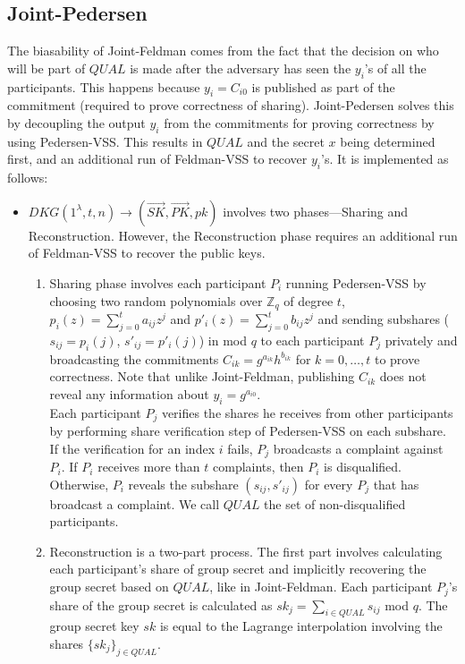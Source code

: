 \documentclass[letterpaper,twocolumn,10pt]{article}
\theoremstyle{definition}
\theoremstyle{remark}
\begin{document}
\subsection{Joint-Pedersen}
\label{appendix:jointPedersen}
The biasability of Joint-Feldman comes from the fact that the decision on who will be part of $QUAL$ is made after the adversary has seen the $y_i$'s of all the participants. This happens because $y_i = C_{i0}$ is published as part of the commitment (required to prove correctness of sharing). Joint-Pedersen solves this by decoupling the output $y_i$ from the commitments for proving correctness by using Pedersen-VSS. This results in $QUAL$ and the secret $x$ being determined first, and an additional run of Feldman-VSS to recover $y_i$'s. It is implemented as follows:
\begin{itemize}
    \item $DKG(1^{\lambda}, t, n) \rightarrow (\vec{SK}, \vec{PK}, pk)$ involves two phases---Sharing and Reconstruction. However, the Reconstruction phase requires an additional run of Feldman-VSS to recover the public keys. 
    \begin{enumerate}
    \item Sharing phase involves each participant $P_i$ running Pedersen-VSS by choosing two random polynomials over $\mathbb{Z}_q$ of degree $t$, $p_i(z) = \sum_{j = 0}^{t} a_{ij} z^j$ and $p'_i(z) = \sum_{j = 0}^{t} b_{ij} z^j$ and sending subshares ($s_{ij} = p_i(j)$, $s'_{ij} = p'_i(j)$) in mod $q$ to each participant $P_j$ privately and broadcasting the commitments $C_{ik} = g^{a_{ik}} h^{b_{ik}}$ for $k = 0, \ldots, t$ to prove correctness. Note that unlike Joint-Feldman, publishing $C_{ik}$ does not reveal any information about $y_i = g^{a_{i0}}$.\\
    Each participant $P_j$ verifies the shares he receives from other participants by performing share verification step of Pedersen-VSS on each subshare. If the verification for an index $i$ fails, $P_j$ broadcasts a complaint against $P_i$.
    If $P_i$ receives more than $t$ complaints, then $P_i$ is disqualified. Otherwise, $P_i$ reveals the subshare $(s_{ij}, s'_{ij})$ for every $P_j$ that has broadcast a complaint. We call $QUAL$ the set of non-disqualified participants.
    
    \item Reconstruction is a two-part process. The first part involves calculating each participant's share of group secret and implicitly recovering the group secret based on $QUAL$, like in Joint-Feldman. Each participant $P_j$'s share of the group secret is calculated as $sk_j = \sum_{i \in QUAL} s_{ij}$ mod $q$.  The group secret key $sk$ is equal to the Lagrange interpolation involving the shares $\{sk_j\}_{j \in QUAL}$. 
    

\end{enumerate}
\end{itemize}
\end{document}
